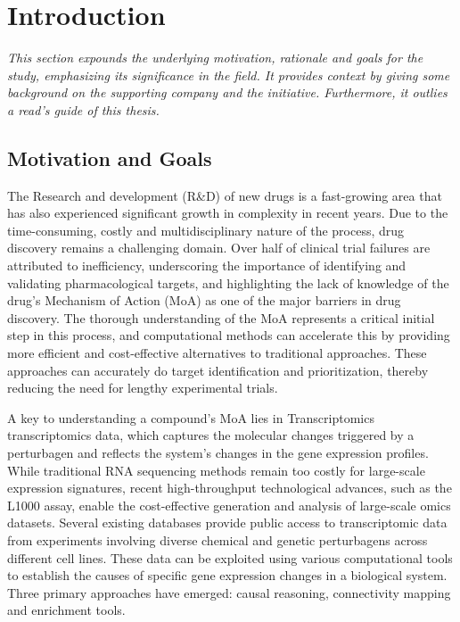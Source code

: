 
%

\makeatletter
\newcommand{\ntifpkgloaded}{%
  \@ifpackageloaded%
}
\makeatother

\chapter{Introduction}
\label{cha:introduction}

\textit{This section expounds the underlying motivation, rationale and goals for the study, emphasizing its significance in the field. It provides context by giving some background on the supporting company and the initiative. Furthermore, it outlies a read’s guide of this thesis.}

\section{Motivation and Goals} %
\label{sec:motivation_and_goals}


The Research and development (R\&D) of new drugs is a fast-growing area that has also experienced significant growth in complexity in recent years. Due to the time-consuming, costly and multidisciplinary nature of the process, drug discovery remains a challenging domain. Over half of clinical trial failures are attributed to inefficiency, underscoring the importance of identifying and validating pharmacological targets, and highlighting the lack of knowledge of the drug’s \gls{Mechanism of Action (MoA)} as one of the major barriers in drug discovery. The thorough understanding of the MoA represents a critical initial step in this process, and computational methods can accelerate this by providing more efficient and cost-effective alternatives to traditional approaches. These approaches can accurately do target identification and prioritization, thereby reducing the need for lengthy experimental trials.

A key to understanding a compound’s MoA lies in \gls{Transcriptomics} transcriptomics data, which captures the molecular changes triggered by a perturbagen and reflects the system’s changes in the gene expression profiles. While traditional RNA sequencing methods remain too costly for large-scale expression signatures, recent high-throughput technological advances, such as the L1000 assay, enable the cost-effective generation and analysis of large-scale omics datasets. Several existing databases provide public access to transcriptomic data from experiments involving diverse chemical and genetic perturbagens across different cell lines. These data can be exploited using various computational tools to establish the causes of specific gene expression changes in a biological system. Three primary approaches have emerged: causal reasoning, connectivity mapping and enrichment tools.

